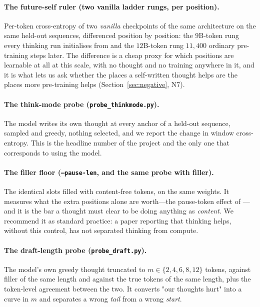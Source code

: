\documentclass{article} %
\begin{document}
\paragraph{The future-self ruler (two vanilla ladder rungs, per position).} Per-token cross-entropy of two \emph{vanilla} checkpoints of the same architecture on the same held-out sequences, differenced position by position: the $9$B-token rung every thinking run initialises from and the $12$B-token rung $11{,}400$ ordinary pre-training steps later. The difference is a cheap proxy for which positions are learnable at all at this scale, with no thought and no training anywhere in it, and it is what lets us ask whether the places a self-written thought helps are the places more pre-training helps (Section~\ref{sec:negative}, N7).

\paragraph{The think-mode probe (\texttt{probe\_thinkmode.py}).} The model writes its own thought at every anchor of a held-out sequence, sampled and greedy, nothing selected, and we report the change in window cross-entropy. This is the headline number of the project and the only one that corresponds to using the model.

\paragraph{The filler floor (\texttt{--pause-len}, and the same probe with filler).} The identical slots filled with content-free tokens, on the same weights. It measures what the extra positions alone are worth---the pause-token effect of \citet{goyal2024think}---and it is the bar a thought must clear to be doing anything as \emph{content}. We recommend it as standard practice: a paper reporting that thinking helps, without this control, has not separated thinking from compute.

\paragraph{The draft-length probe (\texttt{probe\_draft.py}).} The model's own greedy thought truncated to $m \in \{2,4,6,8,12\}$ tokens, against filler of the same length and against the true tokens of the same length, plus the token-level agreement between the two. It converts "our thoughts hurt" into a curve in $m$ and separates a wrong \emph{tail} from a wrong \emph{start}.
\end{document}
